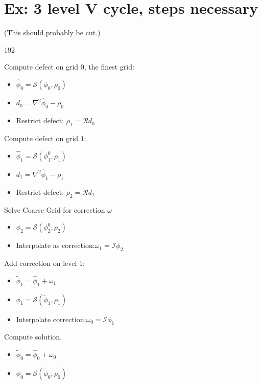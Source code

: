 \section{Ex: 3 level V cycle, steps necessary}
	\label{sec:EX_V_Ccyles}

	(This should probably be cut.)

\begin{dingautolist}{192}
			\item Compute defect on grid \(0\), the finest grid:
		\begin{itemize}
			\item	\( \widehat{\phi}_0 = \mathcal{S}(\phi_0, \rho_0)\)
			\item 	\(d_0 = \nabla^2\widehat{\phi}_0 - \rho_0\)
			\item Restrict defect: \(\rho_1 = \mathcal{R}d_0 \) \nonumber
		\end{itemize}
	\item Compute defect on grid \(1\):
		\begin{itemize}
			\item \(\widehat{\phi}_1 = \mathcal{S}(\phi_1^0, \rho_1)\)
			\item \(d_1 = \nabla^2\widehat{\phi}_1 - \rho_1 \)
			\item Restrict defect: \(\rho_2 = \mathcal{R}d_1 \)
		\end{itemize}
	\item Solve Coarse Grid for correction \(\omega\)
		\begin{itemize}
			\item \( \phi_2 = \mathcal{S}(\phi_2^0, \rho_2)\)
			\item Interpolate as correction:\(\omega_1 = \mathcal{I}\phi_2\)
		\end{itemize}
	\item Add correction on level 1:
		\begin{itemize}
			\item \(\widetilde{\phi}_1 = \widehat{\phi}_1 + \omega_1\)
			\item \( \phi_1 = \mathcal{S}(\widetilde{\phi}_1, \rho_1)  \)
			\item Interpolate correction:\( \omega_0 = \mathcal{I} \phi_1\)
		\end{itemize}
	\item Compute solution.
		\begin{itemize}
			\item \(\widetilde{\phi}_0 = \widehat{\phi}_0 + \omega_0\)
			\item \( \phi_0 = \mathcal{S}(\widetilde{\phi}_0, \rho_0)  \)
		\end{itemize}
\end{dingautolist}
